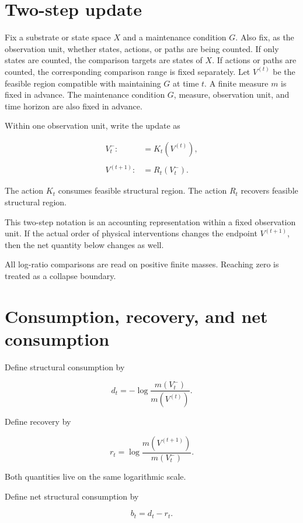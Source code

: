\documentclass[12pt,a4paper]{article}
\begin{document}
\section{Two-step update}\label{two-step-update}

Fix a substrate or state space \(X\) and a maintenance condition \(G\). Also fix, as the observation unit, whether states, actions, or paths are being counted. If only states are counted, the comparison targets are states of \(X\). If actions or paths are counted, the corresponding comparison range is fixed separately. Let \(V^{(t)}\) be the feasible region compatible with maintaining \(G\) at time \(t\). A finite measure \(m\) is fixed in advance. The maintenance condition \(G\), measure, observation unit, and time horizon are also fixed in advance.

Within one observation unit, write the update as

\[
\begin{aligned}
V_{t}^- :&= K_{t}(V^{(t)}), \\
\qquad \\
V^{(t+1)} :&= R_{t}(V_{t}^-).
\end{aligned}
\]

The action \(K_{t}\) consumes feasible structural region. The action \(R_{t}\) recovers feasible structural region.

This two-step notation is an accounting representation within a fixed observation unit. If the actual order of physical interventions changes the endpoint \(V^{(t+1)}\), then the net quantity below changes as well.

All log-ratio comparisons are read on positive finite masses. Reaching zero is treated as a collapse boundary.

\section{Consumption, recovery, and net consumption}\label{consumption-recovery-and-net-consumption}

Define structural consumption by

\[
d_{t}=-\log\frac{m(V_{t}^-)}{m(V^{(t)})}.
\]

Define recovery by

\[
r_{t}=\log\frac{m(V^{(t+1)})}{m(V_{t}^-)}.
\]

Both quantities live on the same logarithmic scale.

Define net structural consumption by

\[
b_{t}=d_{t}-r_{t}.
\]
\end{document}
